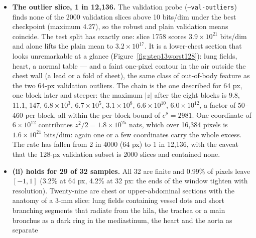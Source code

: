 \documentclass[11pt]{article}
\begin{document}
\begin{itemize}
        validation curve is monotone through every one of those epochs
        (2.6211, 2.6020, 2.5971, 2.5941, 2.5912, 2.5885, 2.5876 at 17 and
        21--26), which is the direct check that the weights were not
        harmed. The plotted gradient norm (finite epochs only) is 346 at
        epoch 1, 14--19 for epochs 2--20 and 44--60 for 27--30; the late
        rise, at a learning rate of $10^{-6}$ or less, has no effect on the
        weights and is not the over-fitting signature it was at 64 px,
        where it came with a rising validation curve.
  \item \textbf{The outlier slice, 1 in 12,136.} The validation probe
        (\texttt{--val-outliers}) finds none of the 2000 validation slices
        above 10 bits/dim under the best checkpoint (maximum 4.27), so the
        robust and plain validation means coincide. The test split has
        exactly one: slice 1758 scores $3.9 \times 10^{21}$ bits/dim and
        alone lifts the plain mean to $3.2 \times 10^{17}$. It is a
        lower-chest section that looks unremarkable at a glance
        (Figure~\ref{fig:step13worst128}): lung fields, heart, a normal
        table --- and a faint one-pixel contour in the air outside the
        chest wall (a lead or a fold of sheet), the same class of
        out-of-body feature as the two 64-px validation outliers. The chain
        is the one described for 64 px, one block later and steeper: the
        maximum $|z|$ after the eight blocks is 9.8, 11.1, 147, $6.8 \times
        10^{3}$, $6.7 \times 10^{5}$, $3.1 \times 10^{8}$, $6.6 \times
        10^{10}$, $6.0 \times 10^{12}$, a factor of 50--460 per block, all
        within the per-block bound of $e^{8} = 2981$. One coordinate of
        $6 \times 10^{12}$ contributes $z^{2}/2 = 1.8 \times 10^{25}$ nats,
        which over 16,384 pixels is $1.6 \times 10^{21}$ bits/dim: again one
        or a few coordinates carry the whole excess. The rate has fallen
        from 2 in 4000 (64 px) to 1 in 12,136, with the caveat that the
        128-px validation subset is 2000 slices and contained none.
  \item \textbf{(ii) holds for 29 of 32 samples.} All 32 are finite and
        0.99\% of pixels leave $[-1,1]$ (3.2\% at 64 px, 4.2\% at 32 px:
        the ends of the window tighten with resolution). Twenty-nine are
        chest or upper-abdominal sections with the anatomy of a 3-mm slice:
        lung fields containing vessel dots and short branching segments
        that radiate from the hila, the trachea or a main bronchus as a
        dark ring in the mediastinum, the heart and the aorta as separate

\end{itemize}
\end{document}
